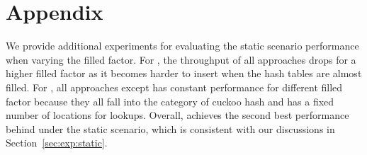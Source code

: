 

\section*{Appendix}
We provide additional experiments for evaluating the static scenario performance when varying the filled factor. 
For , the throughput of all approaches drops for a higher filled factor as it becomes harder to insert when the hash tables are almost filled.
For , all approaches except \linear has constant performance for different filled factor because they all fall into the category of cuckoo hash and has a fixed number of locations for lookups. 
Overall, \voter achieves the second best performance behind \megakv under the static scenario, which is consistent with our discussions in Section~\ref{sec:exp:static}.

